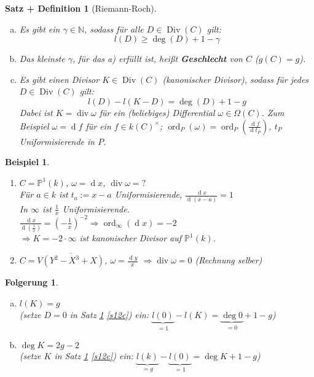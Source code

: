 \documentclass[a4paper,12pt]{report}
\theoremstyle{break}
\newtheorem{SatzDef}[Satz]{Satz + Definition}
\newtheorem{Folg}[Def]{Folgerung}
\theoremstyle{nonumberbreak}
\newtheorem{nnBsp}{Beispiel}
\theoremstyle{nonumberplain}
\newcommand{\quot}[1]{\textrm{\glqq}{#1}\textrm{\grqq}}
\newcommand{\emp}[1]{\textbf{\emph{#1}}}
\newcommand{\begriff}[1]{{\index{#1}}\emp{#1}}
\DeclareMathOperator{\Div}{Div}
\DeclareMathOperator{\Ddiv}{div}
\DeclareMathOperator{\ddiv}{div}
\DeclareMathOperator{\dd}{d} %
\DeclareMathOperator{\ord}{ord}
\newcommand{\N}{\mathbb{N}}
\newcommand{\IP}{\mathbb{P}}%
\newcommand{\X}{\times}
\begin{document}
\begin{SatzDef}[Riemann-Roch]\label{s12}\begin{enumerate}[a)]
\item\label{s12a}
	Es gibt ein $\gamma \in \N$, sodass f\"ur alle $D\in \Div(C)$ gilt:
		\[ l(D) \ge \deg(D) + 1 - \gamma \]
\item
	Das kleinste $\gamma$, f\"ur das a) erf\"ullt ist, hei\ss t \begriff{Geschlecht} von $C$ ($g(C)=g$).
\item\label{s12c}
	Es gibt einen Divisor $K \in \Div(C)$ (\quot{kanonischer Divisor}), sodass f\"ur jedes $D\in \Div(C)$ gilt:
		\[ l(D)- l(K-D) = \deg(D) +1 - g \]
	Dabei ist $K= \Ddiv \omega$ f\"ur ein (beliebiges) Differential $\omega \in \Omega(C)$. Zum Beispiel $\omega = \dd f$ f\"ur ein $f\in k(C)^\X$; $\ord_P(\omega)=\ord_P(\frac{\dd f}{\dd t_P})$, $t_P$ Uniformisierende in $P$.
\end{enumerate}\end{SatzDef}

\begin{nnBsp}\begin{enumerate}[1)]
\item
	$C=\IP^1(k)$, $\omega=\dd x$, $\ddiv \omega =?$\\
	F\"ur $a\in k$ ist $t_a:=x-a$ Uniformisierende, $\frac{\dd x}{\dd (x-a)}=1$\\
	In $\infty$ ist $\frac{1}{x}$ Uniformisierende.\\
	$\frac{\dd x}{\dd(\frac{1}{x})} = (-\frac{1}{x})^{-2} \Rightarrow \ord_\infty(\dd x) = -2$\\
	$\Rightarrow K=-2\cdot \infty$ ist kanonischer Divisor auf $\IP^1(k)$.
\item
	$C=\overline{V(Y^2-X^3+X)}$, $\omega = \frac{\dd y}{x}$ $\Rightarrow \ddiv \omega = 0$ (Rechnung selber)
\end{enumerate}\end{nnBsp}

\begin{Folg}\begin{enumerate}[a)]
\item
	$l(K)=g$\\
	(setze $D=0$ in Satz \ref{s12} \ref{s12c}) ein: $\underbrace{l(0)}_{=1} - l(K) = \underbrace{\deg 0}_{=0} + 1 - g$)
	\item
	$\deg K = 2g - 2$\\
	(setze $K$ in Satz \ref{s12} \ref{s12c}) ein: $\underbrace{l(k)}_{=g} - \underbrace{l(0)}_{=1} = \deg K + 1 - g$)
\end{enumerate}\end{Folg}
\end{document}
